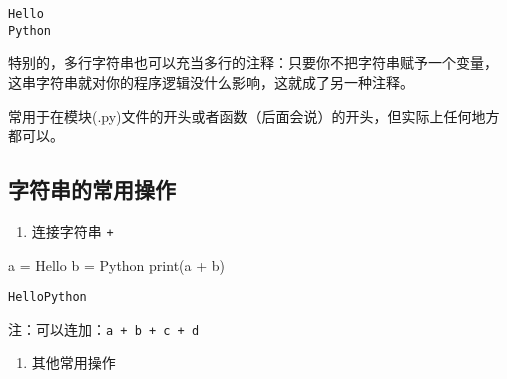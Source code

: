 \documentclass[
  letterpaper,
  DIV=11,
  numbers=noendperiod]{scrreprt}
\newenvironment{Shaded}{\begin{snugshade}}{\end{snugshade}}
\newcommand{\BuiltInTok}[1]{\textcolor[rgb]{0.00,0.23,0.31}{#1}}
\newcommand{\NormalTok}[1]{\textcolor[rgb]{0.00,0.23,0.31}{#1}}
\newcommand{\OperatorTok}[1]{\textcolor[rgb]{0.37,0.37,0.37}{#1}}
\newcommand{\StringTok}[1]{\textcolor[rgb]{0.13,0.47,0.30}{#1}}
\providecommand{\tightlist}{%
  \setlength{\itemsep}{0pt}\setlength{\parskip}{0pt}}\usepackage{longtable,booktabs,array}
\begin{document}
\begin{verbatim}
Hello 
Python
\end{verbatim}

特别的，多行字符串也可以充当多行的注释：只要你不把字符串赋予一个变量，
这串字符串就对你的程序逻辑没什么影响，这就成了另一种注释。

常用于在模块(.py)文件的开头或者函数（后面会说）的开头，但实际上任何地方都可以。

\hypertarget{ux5b57ux7b26ux4e32ux7684ux5e38ux7528ux64cdux4f5c}{%
\subsection{字符串的常用操作}\label{ux5b57ux7b26ux4e32ux7684ux5e38ux7528ux64cdux4f5c}}

\begin{enumerate}
\def\labelenumi{\arabic{enumi}.}
\tightlist
\item
  连接字符串 \texttt{+}
\end{enumerate}

\begin{Shaded}
\begin{Highlighting}[]
\NormalTok{a }\OperatorTok{=} \StringTok{\textquotesingle{}Hello\textquotesingle{}}
\NormalTok{b }\OperatorTok{=} \StringTok{\textquotesingle{}Python\textquotesingle{}}
\BuiltInTok{print}\NormalTok{(a }\OperatorTok{+}\NormalTok{ b)}
\end{Highlighting}
\end{Shaded}

\begin{verbatim}
HelloPython
\end{verbatim}

注：可以连加：\texttt{a\ +\ b\ +\ c\ +\ d}

\begin{enumerate}
\def\labelenumi{\arabic{enumi}.}
\setcounter{enumi}{1}
\tightlist
\item
  其他常用操作
\end{enumerate}
\end{document}
